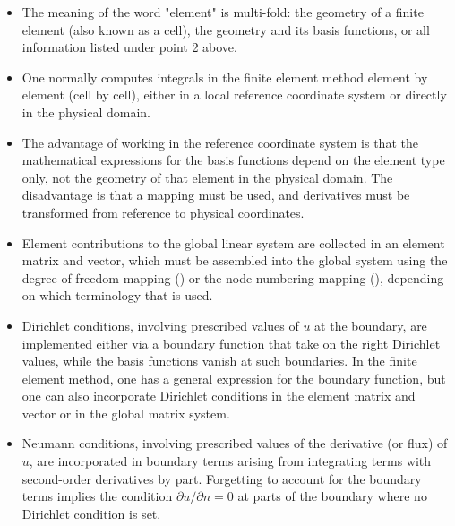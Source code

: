 \documentclass[../main.tex]{subfiles}
\begin{document}
\begin{itemize}
\begin{enumerate}
		\end{enumerate}
	\item The meaning of the word "element" is multi-fold: the geometry of a finite element (also known as a cell), the geometry and its basis functions, or all information listed under point 2 above.
	\item One normally computes integrals in the finite element method element by element (cell by cell), either in a local reference coordinate system or directly in the physical domain.
	\item The advantage of working in the reference coordinate system is that the mathematical expressions for the basis functions depend on the element type only, not the geometry of that element in the physical domain. The disadvantage is that a mapping must be used, and derivatives must be transformed from reference to physical coordinates.
	\item Element contributions to the global linear system are collected in an element matrix and vector, which must be assembled into the global system using the degree of freedom mapping () or the node numbering mapping (), depending on which terminology that is used.
	\item Dirichlet conditions, involving prescribed values of $u$ at the boundary, are implemented either via a boundary function that take on the right Dirichlet values, while the basis functions vanish at such boundaries. In the finite element method, one has a general expression for the boundary function, but one can also incorporate Dirichlet conditions in the element matrix and vector or in the global matrix system.
	\item Neumann conditions, involving prescribed values of the derivative (or flux) of $u$, are incorporated in boundary terms arising from integrating terms with second-order derivatives by part. Forgetting to account for the boundary terms implies the condition $\partial u / \partial n=0$ at parts of the boundary where no Dirichlet condition is set.
\end{itemize}
\clearpage
\end{document}
